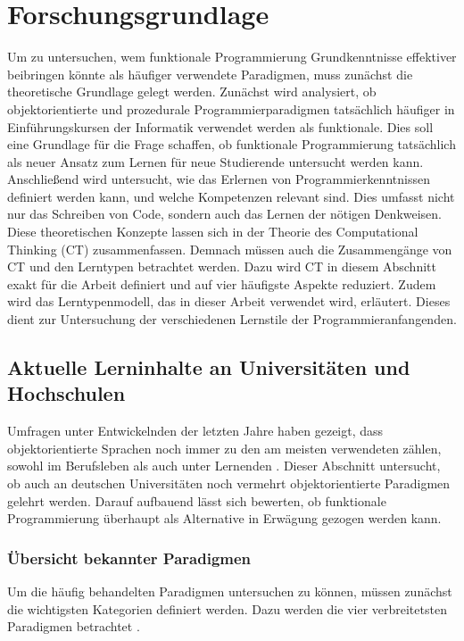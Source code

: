 \clearpage
\section{Forschungsgrundlage}
\label{sec:research}

Um zu untersuchen, wem funktionale Programmierung Grundkenntnisse effektiver beibringen könnte als häufiger verwendete Paradigmen, muss zunächst die theoretische Grundlage gelegt werden.
Zunächst wird analysiert, ob objektorientierte und prozedurale Programmierparadigmen tatsächlich häufiger in Einführungskursen der Informatik verwendet werden als funktionale. Dies soll eine Grundlage für die Frage schaffen, ob funktionale Programmierung tatsächlich als neuer Ansatz zum Lernen für neue Studierende untersucht werden kann.
Anschließend wird untersucht, wie das Erlernen von Programmierkenntnissen definiert werden kann, und welche Kompetenzen relevant sind. Dies umfasst nicht nur das Schreiben von Code, sondern auch das Lernen der nötigen Denkweisen. Diese theoretischen Konzepte lassen sich in der Theorie des Computational Thinking (CT) zusammenfassen. Demnach müssen auch die Zusammengänge von CT und den Lerntypen betrachtet werden.
Dazu wird CT in diesem Abschnitt exakt für die Arbeit definiert und auf vier häufigste Aspekte reduziert. Zudem wird das Lerntypenmodell, das in dieser Arbeit verwendet wird, erläutert. Dieses dient zur Untersuchung der verschiedenen Lernstile der Programmieranfangenden.

\subsection{Aktuelle Lerninhalte an Universitäten und Hochschulen}
Umfragen unter Entwickelnden der letzten Jahre haben gezeigt, dass objektorientierte Sprachen noch immer zu den am meisten verwendeten zählen, sowohl im Berufsleben als auch unter Lernenden \cite{stackoverflow}. Dieser Abschnitt untersucht, ob auch an deutschen Universitäten noch vermehrt objektorientierte Paradigmen gelehrt werden.
Darauf aufbauend lässt sich bewerten, ob funktionale Programmierung überhaupt als Alternative in Erwägung gezogen werden kann.

\subsubsection{Übersicht bekannter Paradigmen}
Um die häufig behandelten Paradigmen untersuchen zu können, müssen zunächst die wichtigsten Kategorien definiert werden. Dazu werden die vier verbreitetsten Paradigmen betrachtet \cite{normak}.

